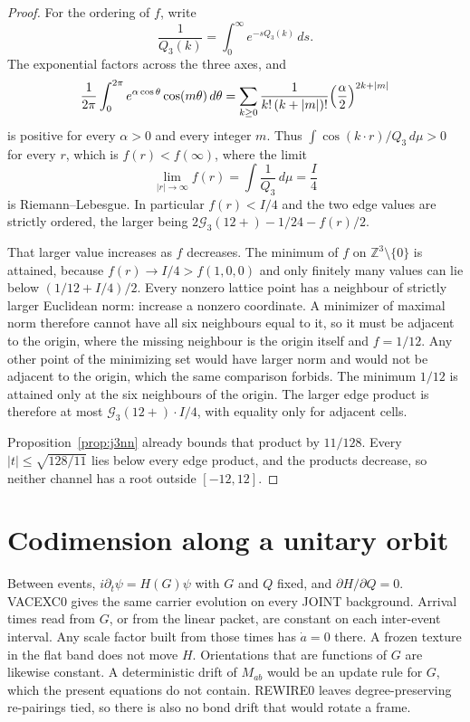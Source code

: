 \begin{proof}
For the ordering of \(f\), write
\[
\frac{1}{Q_3(k)}=\int_0^\infty e^{-s Q_3(k)}\,ds.
\]
The exponential factors across the three axes, and
\[
\frac{1}{2\pi}\int_0^{2\pi}e^{\alpha\cos\theta}\cos(m\theta)\,d\theta
=\sum_{k\ge 0}\frac{1}{k!\,(k+|m|)!}\Bigl(\frac\alpha2\Bigr)^{2k+|m|}
\]
is positive for every \(\alpha>0\) and every integer \(m\).
Thus \(\int\cos(k\cdot r)/Q_3\,d\mu>0\) for every \(r\), which is
\(f(r)<f(\infty)\), where the limit
\[
\lim_{|r|\to\infty}f(r)
=\int\frac{1}{Q_3}\,d\mu=\frac I4
\]
is Riemann–Lebesgue.
In particular \(f(r)<I/4\) and the two edge values are strictly ordered,
the larger being \(2\mathcal{G}_3(12+)-1/24-f(r)/2\).

That larger value increases as \(f\) decreases.
The minimum of \(f\) on \(\mathbb{Z}^3\setminus\{0\}\) is attained, because
\(f(r)\to I/4>f(1,0,0)\) and only finitely many values can lie below
\((1/12+I/4)/2\).
Every nonzero lattice point has a neighbour of strictly larger Euclidean
norm: increase a nonzero coordinate.
A minimizer of maximal norm therefore cannot have all six neighbours equal
to it, so it must be adjacent to the origin, where the missing neighbour
is the origin itself and \(f=1/12\).
Any other point of the minimizing set would have larger norm and would
not be adjacent to the origin, which the same comparison forbids.
The minimum \(1/12\) is attained only at the six neighbours of the origin.
The larger edge product is therefore at most
\(\mathcal{G}_3(12+)\cdot I/4\), with equality only for adjacent cells.

Proposition~\ref{prop:j3nn} already bounds that product by \(11/128\).
Every \(|t|\le\sqrt{128/11}\) lies below every edge product, and the
products decrease, so neither channel has a root outside \([-12,12]\).
\end{proof}

\section{Codimension along a unitary orbit}
\label{sec:codim}

Between events, \(i\partial_t\psi=H(G)\psi\) with \(G\) and \(Q\) fixed,
and \(\partial H/\partial Q=0\).
VACEXC0 gives the same carrier evolution on every JOINT background.
Arrival times read from \(G\), or from the linear packet, are constant on
each inter-event interval.
Any scale factor built from those times has \(\dot a=0\) there.
A frozen texture in the flat band does not move \(H\).
Orientations that are functions of \(G\) are likewise constant.
A deterministic drift of \(M_{ab}\) would be an update rule for \(G\),
which the present equations do not contain.
REWIRE0 leaves degree-preserving re-pairings tied, so there is also no
bond drift that would rotate a frame.

